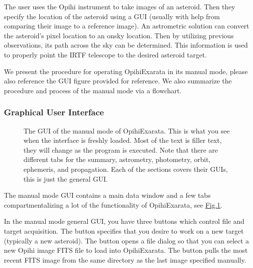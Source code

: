 \documentclass[letterpaper,11pt,english]{sphinxmanual}
\begin{document}
\sphinxAtStartPar
The user uses the Opihi instrument to take images of an asteroid. Then they
specify the location of the asteroid using a GUI (usually with help from
comparing their image to a reference image). An astrometric solution can
convert the asteroid’s pixel location to an on\sphinxhyphen{}sky location. Then by
utilizing previous observations, its path across the sky can be determined.
This information is used to properly point the IRTF telescope to the desired
asteroid target.

\sphinxAtStartPar
We present the procedure for operating OpihiExarata in its manual mode,
please also reference the GUI figure provided for reference. We also summarize
the procedure and process of the manual mode via a flowchart.


\subsubsection{Graphical User Interface}
\label{\detokenize{user/manual_mode:graphical-user-interface}}\label{\detokenize{user/manual_mode:user-manual-mode-graphical-user-interface}}
\begin{figure}[H]
\centering
\capstart

\noindent{}
\caption{The GUI of the manual mode of OpihiExarata. This is what you see when
the interface is freshly loaded. Most of the text is filler text, they will
change as the program is executed. Note that there are different tabs for
the summary, astrometry, photometry, orbit, ephemeris, and propagation.
Each of the sections covers their GUIs, this is just the general GUI.}\label{\detokenize{user/manual_mode:id2}}\label{\detokenize{user/manual_mode:figure-manual-mode-gui-all}}\end{figure}

\sphinxAtStartPar
The manual mode GUI contains a main data window and a few tabs
compartmentalizing a lot of the functionality of OpihiExarata, see
\hyperref[\detokenize{user/manual_mode:figure-manual-mode-gui-all}]{Fig.\@ \ref{\detokenize{user/manual_mode:figure-manual-mode-gui-all}}}.

\sphinxAtStartPar
In the manual mode general GUI, you have three buttons which control file
and target acquisition. The  button specifies that you
desire to work on a new target (typically a new asteroid). The
 button opens a file dialog so that you can
select a new Opihi image FITS file to load into OpihiExarata. The
 button pulls the most recent FITS image from
the same directory as the last image specified manually.
\end{document}
